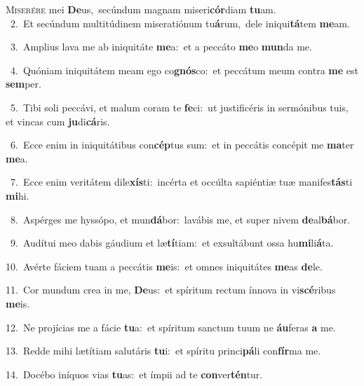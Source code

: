 \lettrine{\initial\textcolor{\initialcolor}{M}}{iserére} mei \textbf{De}\-us,~\star secúndum magnam miseri\-\textbf{cór}\-diam \textbf{tu}\-am.\\
{\numbfont\textcolor{\numbcolor}{~2.}}~Et secúndum multitúdinem miseratiónum tu\-\textbf{á}\-rum,~\star dele iniqui\-\textbf{tá}\-tem \textbf{me}\-am.\par
{\numbfont\textcolor{\numbcolor}{~3.}}~Amplius lava me ab iniquitáte \textbf{me}\-a:~\star et a peccáto \textbf{me}\-o \textbf{mun}\-da me.\par
{\numbfont\textcolor{\numbcolor}{~4.}}~Quóniam iniquitátem meam ego co\-\textbf{gnós}\-co:~\star et peccátum meum contra \textbf{me} est \textbf{sem}\-per.\par
{\numbfont\textcolor{\numbcolor}{~5.}}~Tibi soli peccávi, et malum coram te \textbf{fe}\-ci:~\star ut justificéris in sermónibus tuis, et vincas cum \textbf{ju}\-di\-\textbf{cá}\-ris.\par
{\numbfont\textcolor{\numbcolor}{~6.}}~Ecce enim in iniquitátibus con\-\textbf{cép}\-tus sum:~\star et in peccátis concépit me \textbf{ma}\-ter \textbf{me}\-a.\par
{\numbfont\textcolor{\numbcolor}{~7.}}~Ecce enim veritátem dile\-\textbf{xís}\-ti:~\star incérta et occúlta sapiéntiæ tuæ manifes\-\textbf{tás}\-ti \textbf{mi}\-hi.\par
{\numbfont\textcolor{\numbcolor}{~8.}}~Aspérges me hyssópo, et mun\-\textbf{dá}\-bor:~\star lavábis me, et super nivem \textbf{de}\-al\-\textbf{bá}\-bor.\par
{\numbfont\textcolor{\numbcolor}{~9.}}~Audítui meo dabis gáudium et læ\-\textbf{tí}\-tiam:~\star et exsultábunt ossa hu\-\textbf{mi}\-li\-\textbf{á}\-ta.\par
{\numbfont\textcolor{\numbcolor}{10.}}~Avérte fáciem tuam a peccátis \textbf{me}\-is:~\star et omnes iniquitátes \textbf{me}\-as \textbf{de}\-le.\par
{\numbfont\textcolor{\numbcolor}{11.}}~Cor mundum crea in me, \textbf{De}\-us:~\star et spíritum rectum ínnova in vi\-\textbf{scé}\-ribus \textbf{me}\-is.\par
{\numbfont\textcolor{\numbcolor}{12.}}~Ne projícias me a fácie \textbf{tu}\-a:~\star et spíritum sanctum tuum ne \textbf{áu}\-feras \textbf{a} me.\par
{\numbfont\textcolor{\numbcolor}{13.}}~Redde mihi lætítiam salutáris \textbf{tu}\-i:~\star et spíritu princi\-\textbf{pá}\-li con\-\textbf{fír}\-ma me.\par
{\numbfont\textcolor{\numbcolor}{14.}}~Docébo iníquos vias \textbf{tu}\-as:~\star et ímpii ad te \textbf{con}\-ver\-\textbf{tén}\-tur.\par
